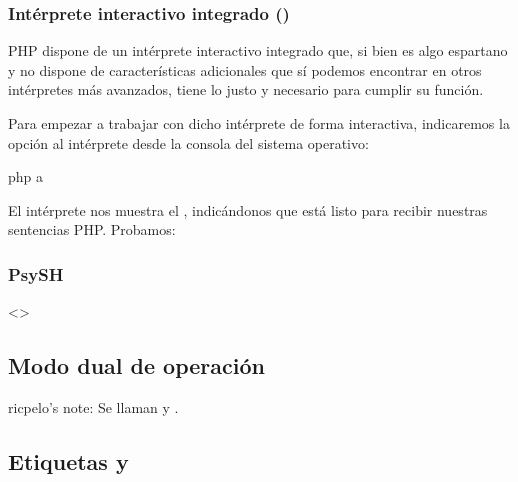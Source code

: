 \documentclass[a4paper,12pt,spanish]{sphinxmanual}
\begin{document}
\subsubsection{Intérprete interactivo integrado ()}
\label{\detokenize{php:interprete-interactivo-integrado-php-a}}
PHP dispone de un intérprete interactivo integrado que, si bien es algo
espartano y no dispone de características adicionales que sí podemos encontrar
en otros intérpretes más avanzados, tiene lo justo y necesario para cumplir su
función.

Para empezar a trabajar con dicho intérprete de forma interactiva, indicaremos
la opción  al intérprete desde la consola del sistema operativo:

\begin{sphinxVerbatim}[commandchars=\\\{\}]
 php \PYGZhy{}a

\end{sphinxVerbatim}

El intérprete nos muestra el  , indicándonos que está listo para recibir nuestras sentencias PHP. Probamos:

\begin{sphinxVerbatim}[commandchars=\\\{\}]
\end{sphinxVerbatim}


\subsubsection{PsySH}
\label{\detokenize{php:psysh}}
\textless{}\textgreater{}


\subsection{Modo dual de operación}
\label{\detokenize{php:modo-dual-de-operacion}}
ricpelo’s note: Se llaman  y .


\subsection{Etiquetas  y }
\label{\detokenize{php:etiquetas-php-y}}
\end{document}
